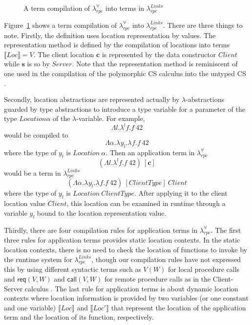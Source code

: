 \documentclass[a4paper]{article}
\theoremstyle{plain}
\theoremstyle{definition}
\newcommand{\rulewidth}{.8\linewidth}
\newcommand{\ruleverticalsephalf}{0.25cm}
\newcommand{\ruleverticalsep}{0.5cm}
\newcommand{\polyrpc}{$\lambda_{rpc}^{\forall}$\xspace}
\newcommand{\linksrpc}{$\lambda_{rpc}^{Links}$\xspace}
\newcommand{\client}{\textbf{c}}
\newcommand{\server}{\textbf{s}}
\newcommand{\lamL}[3]{\lambda^{#1}#2.#3}
\newcommand{\subst}[2]{\{#1/#2\}}
\newcommand{\textsfReq}{\textsf{req}}
\newcommand{\req}[2]{\textsfReq(#1,#2)}
\newcommand{\textsfCall}{\textsf{call}}
\newcommand{\call}[2]{\textsfCall(#1,#2)}
\newcommand{\tyenv}{\Gamma}
\newcommand{\judgcomp}[2]{\llbracket#1\rrbracket_{#2}}
\newcommand{\loctycomp}[1]{L\llbracket#1\rrbracket}
\newcommand{\polytycomp}[1]{T\llbracket#1\rrbracket}
\newcommand{\anncomp}[1]{Ann\llbracket#1\rrbracket}
\newcommand{\loctmcomp}[1]{\llbracket#1\rrbracket}
\newcommand{\Loc}{Loc}
\begin{document}
\begin{figure}[t]
\caption{A term compilation of \polyrpc into terms in \linksrpc}
\label{fig:termcompilationback}
\end{figure}

%
Figure~\ref{fig:termcompilationback} shows a term compilation of
\polyrpc into \linksrpc.
%
There are three things to note.
%
Firstly, the definition uses location representation by values.
%
The representation method is defined by the compilation of locations
into terms $\loctmcomp{\Loc}=V$.
%
The client location $\client$ is represented by the data constructor
$Client$ while $\server$ is so by $Server$.
%
Note that the representation method is reminiscent of one used in the
compilation of the polymorphic CS calculus into the untyped CS
\cite{cclr2021}.

%
Secondly, location abstractions are represented actually by
$\lambda$-abstractions guarded by type abstractions to introduce a
type variable for a parameter of the type $Location \alpha$ of the
$\lambda$-variable.
%
For example,
\[
\Lambda l.\lamL{l}{f}{f \ 42}
\]
would be compiled to
\[
\Lambda\alpha.\lamL{}{y_l}{\lamL{}{f}{f \ 42}}
\]
where the type of
$y_l$ is $Location \ \alpha$.
%
Then an application term in \polyrpc 
\[
(\Lambda l.\lamL{l}{f}{f \ 42}) \ [\client]
\]
would be a term in \linksrpc
\[
(\Lambda\alpha.\lamL{}{y_l}{\lamL{}{f}{f \ 42}}) \ [ClientType]
\ Client
\]
where the type of $y_l$ is $Location \ ClientType$.
%
After applying it to the client location value $Client$, this location
can be examined in runtime through a variable $y_l$ bound to the
location representation value.

%
Thirdly, there are four compilation rules for application terms in
\polyrpc.
%
The first three rules for application terms provides static location
contexts.
%
In the static location contexts, there is no need to check the
location of functions to invoke by the runtime system for \linksrpc,
though our compilation rules have not expressed this by using
different syntactic terms such as $V(W)$ for local procedure calls and
$\req{V}{W}$ and $\call{V}{W}$ for remote procedure calls as in the
Client-Server calculus \cite{cclr2021}.
%
The last rule for application terms is about dynamic location contexts
where location information is provided by two variables (or one
constant and one variable) $\loctmcomp{\Loc}$ and $\loctmcomp{\Loc'}$
that represent the location of the application term and the location
of its function, respectively.
\end{document}
